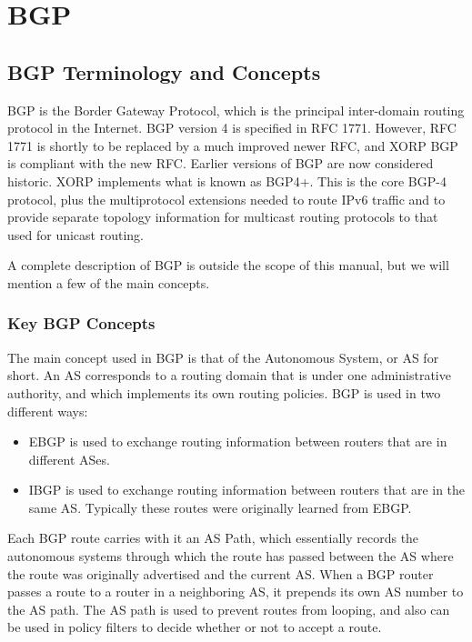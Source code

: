 %
%

\chapter{BGP}
\label{bgp}
\section{BGP Terminology and Concepts}

BGP is the Border Gateway Protocol, which is the principal inter-domain
routing protocol in the Internet.  BGP version 4 is specified in RFC
1771.  However, RFC 1771 is shortly to be replaced by a much improved
newer RFC, and XORP BGP is compliant with the new RFC.  Earlier
versions of BGP are now considered historic.  XORP implements what is
known as BGP4+.  This is the core BGP-4 protocol, plus the
multiprotocol extensions needed to route IPv6 traffic and to provide
separate topology information for multicast routing protocols to that
used for unicast routing.

A complete description of BGP is outside the scope of this manual, but
we will mention a few of the main concepts.  

\subsection{Key BGP Concepts}

The main concept used in BGP is that of the Autonomous System, or AS
for short.  An AS corresponds to a routing domain that is under one
administrative authority, and which implements its own routing
policies.  BGP is used in two different ways:
\begin{itemize}
\item EBGP is used to exchange routing information between routers
that are in different ASes.
\item IBGP is used to exchange routing information between routers
that are in the same AS.  Typically these routes were originally
learned from EBGP.
\end{itemize}
Each BGP route carries with it an AS Path, which essentially records
the autonomous systems through which the route has passed between the
AS where the route was originally advertised and the current AS.  When
a BGP router passes a route to a router in a neighboring AS, it
prepends its own AS number to the AS path.  The AS path is used to
prevent routes from looping, and also can be used in policy filters to
decide whether or not to accept a route.

